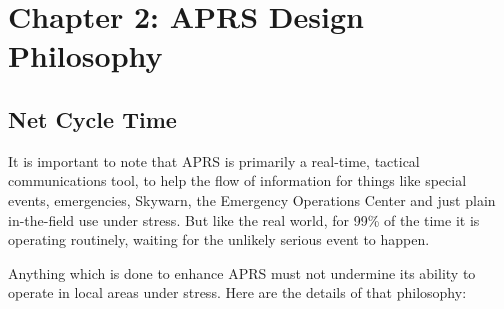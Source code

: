 \chapter{Chapter 2: APRS Design Philosophy}


\section{Net Cycle Time}

It is important to note that APRS is primarily a real-time, tactical
communications tool, to help the flow of information for things like special
events, emergencies, Skywarn, the Emergency Operations Center and just
plain in-the-field use under stress. But like the real world, for 99\% of the
time it is operating routinely, waiting for the unlikely serious event to
happen.

Anything which is done to enhance APRS must not undermine its ability to
operate in local areas under stress. Here are the details of that philosophy:


